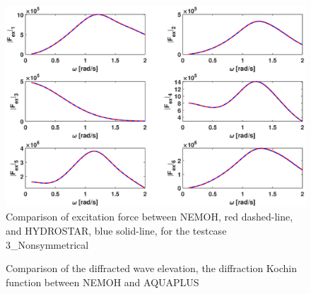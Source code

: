 \documentclass[12pt,a4paper,titlepage]{article}
\begin{document}
\begin{figure}[ht!]
\centering
\includegraphics[scale=0.5,trim = 10mm 0mm 30mm 0mm, clip]{figures/Ver_NonSymmetrical_excitationforce.eps}
\caption{Comparison of excitation force between NEMOH, red dashed-line, and HYDROSTAR, blue solid-line, for the testcase 3\_Nonsymmetrical}\label{fig:NonSymmetrical_excforce}
\end{figure}

\begin{figure}[ht!]
\centering
{}
\caption{Comparison of the diffracted wave elevation, the diffraction Kochin function between NEMOH and AQUAPLUS}\label{fig:PostProcessing}
\end{figure}
\end{document}
